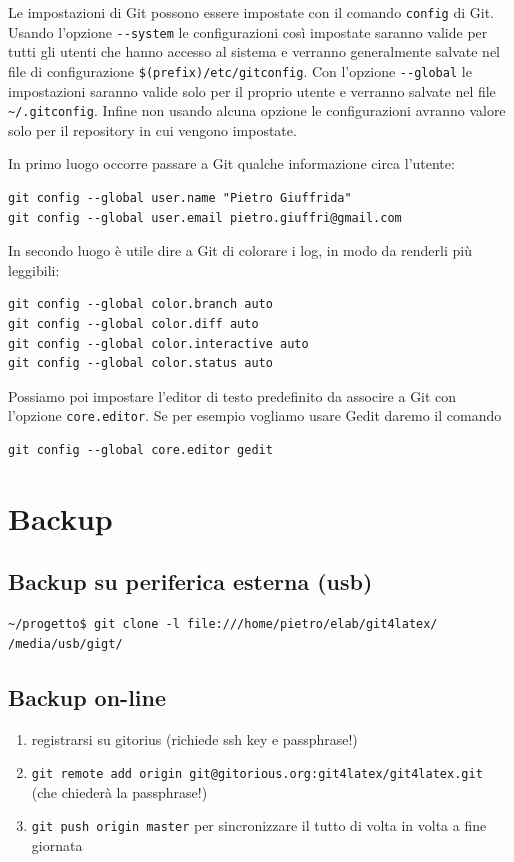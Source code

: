\documentclass[a4paper,12pt,oneside]{article}
\begin{document}
Le impostazioni di Git possono essere impostate con il comando
\lstinline|config| di Git. Usando l'opzione \lstinline|--system| le configurazioni
così impostate saranno valide per tutti gli utenti che hanno accesso al sistema
e verranno generalmente salvate nel file di configurazione
\lstinline|$(prefix)/etc/gitconfig|. Con l'opzione \lstinline|--global| le impostazioni
saranno valide solo per il proprio utente e verranno salvate nel file
\lstinline|~/.gitconfig|. Infine non usando alcuna opzione le configurazioni
avranno valore solo per il repository in cui vengono impostate.

In primo luogo occorre passare a Git qualche informazione circa l'utente:
\begin{lstlisting}
git config --global user.name "Pietro Giuffrida"
git config --global user.email pietro.giuffri@gmail.com
\end{lstlisting}
In secondo luogo è utile dire a Git di colorare i log, in modo da renderli più
leggibili:
\begin{lstlisting}
git config --global color.branch auto
git config --global color.diff auto
git config --global color.interactive auto
git config --global color.status auto
\end{lstlisting}
Possiamo poi impostare l'editor di testo predefinito da associre a Git con
l'opzione \lstinline|core.editor|. Se per esempio vogliamo usare Gedit daremo
il comando
\begin{lstlisting}
git config --global core.editor gedit
\end{lstlisting}

\section{Backup}
\subsection{Backup su periferica esterna (usb)}
\begin{lstlisting}
~/progetto$ git clone -l file:///home/pietro/elab/git4latex/ /media/usb/gigt/
\end{lstlisting}

\subsection{Backup on-line}
\label{sec:backup-on-line}

\begin{enumerate}
\item registrarsi su gitorius (richiede ssh key e passphrase!)
\item \lstinline|git remote add origin git@gitorious.org:git4latex/git4latex.git|
  (che chiederà la passphrase!)
\item \lstinline|git push origin master|
  per sincronizzare il tutto di volta in volta a fine giornata
\end{enumerate}
\end{document}
